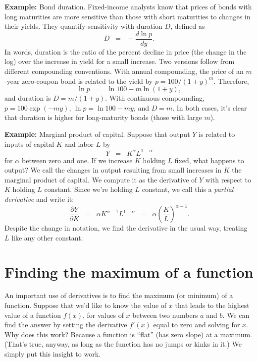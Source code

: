 \textbf{Example:}    Bond duration. 
Fixed-income analysts know that prices of bonds  with long maturities
are more sensitive than those with short maturities to changes in their yields.
They quantify sensitivity with duration $D$, defined as
\[
    D \;\;=\;\; - \frac{d \ln p}{dy} .
\]
In words, duration is the ratio of the percent decline in price (the change in the log)
over the increase in yield 
 for a small increase.
Two versions follow from different compounding conventions.
With annual compounding, the price of an $m$-year zero-coupon bond 
is related to the yield 
 by $ p = 100/(1+y)^m$.
Therefore,
\[
    \ln p \;\;=\;\; \ln 100 - m \ln (1+y),
\]
and duration is $ D = m/(1+y)$.
With continuous compounding, $ p = 100 \exp(-my)$,
$ \ln p = \ln 100 - m y$,
and $D = m$.
In both cases, it's clear that duration is higher for long-maturity bonds 
(those with large $m$).


\textbf{Example:}  Marginal product   of capital.
Suppose that output $Y$ is related to inputs of capital $K$ and labor $L$ by
\[
    Y \;\;=\;\; K^\alpha L^{1-\alpha}
\]
for $\alpha$ between zero and one.
If we increase $K$ holding $L$ fixed, what happens to output?
We call the changes in output resulting from small increases in $K$
the marginal product   of capital.
We compute it as the derivative of $Y$ with respect to $K$ holding $L$ constant.
Since we're holding $L$ constant, we call this a {\it partial derivative\/} and write it:
\[
    \frac{\partial Y}{\partial K} \;\;=\;\;
    \alpha K^{\alpha-1} L^{1-\alpha} \;\;=\;\; \alpha \left(\frac{K}{L}\right)^{\alpha-1}.
\]
Despite the change in notation, we find the derivative in the usual way,
treating $L$ like any other constant. 


\section{Finding the maximum of a function}

An important use of derivatives is to find the maximum (or minimum) of a function.
Suppose that we'd like to know the value of $x$
that leads to the highest value of a function $f(x)$,
for values of $x$ between two numbers $a$ and $b$.
We can find the answer by setting the derivative $f'(x)$ equal to zero and solving for $x$.
Why does this work?
Because a function is ``flat'' (has zero slope) at a maximum.
(That's true, anyway, as long as the function has no jumps or kinks in it.)
We simply put this insight to work.


